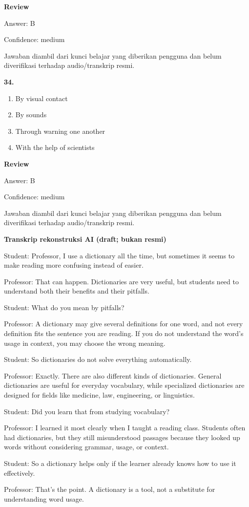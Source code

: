 \documentclass[12pt]{article}
\begin{document}
\textbf{Review}\par
Answer: B\par
Confidence: medium\par
Jawaban diambil dari kunci belajar yang diberikan pengguna dan belum diverifikasi terhadap audio/transkrip resmi.\par
\endgroup
\par
\vspace{0.25\baselineskip}
\noindent\textbf{34.}
\begin{enumerate}[label=(\Alph*),leftmargin=*,itemsep=0.2em]
\item By visual contact
\item By sounds
\item Through warning one another
\item With the help of scientists
\end{enumerate}
\par
\begingroup
\setlength{\parskip}{0pt}
\setlength{\parindent}{0pt}
\textbf{Review}\par
Answer: B\par
Confidence: medium\par
Jawaban diambil dari kunci belajar yang diberikan pengguna dan belum diverifikasi terhadap audio/transkrip resmi.\par
\endgroup
\par
\vspace{0.25\baselineskip}
\begin{exampleblock}
\textbf{Transkrip rekonstruksi AI (draft; bukan resmi)}\par
Student: Professor, I use a dictionary all the time, but sometimes it seems to make reading more confusing instead of easier.\par
Professor: That can happen. Dictionaries are very useful, but students need to understand both their benefits and their pitfalls.\par
Student: What do you mean by pitfalls?\par
Professor: A dictionary may give several definitions for one word, and not every definition fits the sentence you are reading. If you do not understand the word's usage in context, you may choose the wrong meaning.\par
Student: So dictionaries do not solve everything automatically.\par
Professor: Exactly. There are also different kinds of dictionaries. General dictionaries are useful for everyday vocabulary, while specialized dictionaries are designed for fields like medicine, law, engineering, or linguistics.\par
Student: Did you learn that from studying vocabulary?\par
Professor: I learned it most clearly when I taught a reading class. Students often had dictionaries, but they still misunderstood passages because they looked up words without considering grammar, usage, or context.\par
Student: So a dictionary helps only if the learner already knows how to use it effectively.\par
Professor: That's the point. A dictionary is a tool, not a substitute for understanding word usage.\par
\end{exampleblock}
\end{document}
